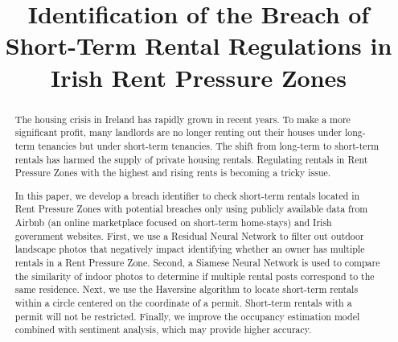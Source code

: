 \documentclass[conference, compsoc]{IEEEtran}
\begin{document}
\title{Identification of the Breach of Short-Term Rental Regulations in Irish Rent Pressure Zones}

\author{
    \and
    \and
}

\maketitle

\begin{abstract}
The housing crisis in Ireland has rapidly grown in recent years.
To make a more significant profit, many landlords are no longer renting out their houses under long-term tenancies but under short-term tenancies.
The shift from long-term to short-term rentals has harmed the supply of private housing rentals.
Regulating rentals in Rent Pressure Zones with the highest and rising rents is becoming a tricky issue.

In this paper, we develop a breach identifier to check short-term rentals located in Rent Pressure Zones with potential breaches only using publicly available data from Airbnb (an online marketplace focused on short-term home-stays) and Irish government websites.
First, we use a Residual Neural Network to filter out outdoor landscape photos that negatively impact identifying whether an owner has multiple rentals in a Rent Pressure Zone.
Second, a Siamese Neural Network is used to compare the similarity of indoor photos to determine if multiple rental posts correspond to the same residence.
Next, we use the Haversine algorithm to locate short-term rentals within a circle centered on the coordinate of a permit.
Short-term rentals with a permit will not be restricted.
Finally, we improve the occupancy estimation model combined with sentiment analysis, which may provide higher accuracy.
\end{abstract}
\end{document}
